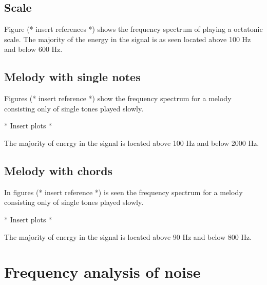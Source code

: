 \subsection{Scale}
Figure (* insert references *) shows the frequency spectrum of playing a octatonic scale.
The majority of the energy in the signal is as seen located above 100 Hz and below 600 Hz.

\subsection{Melody with single notes}
Figures (* insert reference *) show the frequency spectrum for a melody consisting only of single tones played slowly.
\begin{center}
* Insert plots *
\end{center}

The majority of energy in the signal is located above 100 Hz and below 2000 Hz.

\subsection{Melody with chords}
In figures (* insert reference *) is seen the frequency spectrum for a melody consisting only of single tones played slowly.
\begin{center}
* Insert plots *
\end{center}

The majority of energy in the signal is located above 90 Hz and below 800 Hz.

\section{Frequency analysis of noise}
